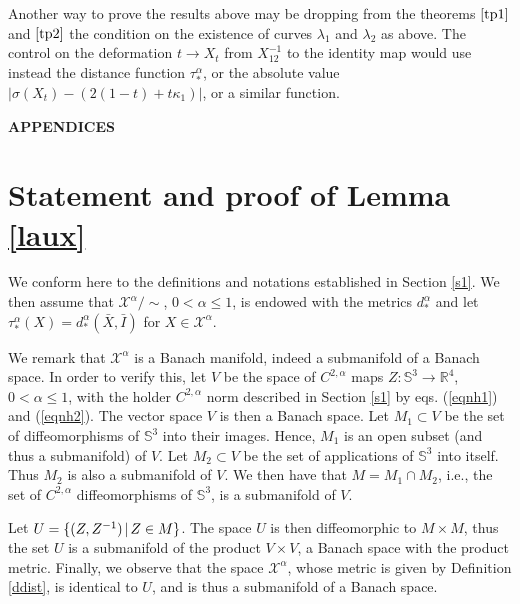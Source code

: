 \documentclass{article}
\def\S3{{\mathbb S^3}}
\begin{document}
Another way to prove the results above may be dropping from the theorems $\ref{tp1}$ and $\ref{tp2}$ the condition on the existence of curves $\lambda_1$ and $\lambda_2$ as above. The control on the deformation $t\to X_t$ from $X_{12}^{-1}$ to the identity map would use instead the distance function $\tau^\alpha_*$, or the absolute value 
$|\sigma(X_t)-(2(1-t)+t\kappa_1)|$, or a similar function.


\vspace{.35in}

\centerline{\large \bf APPENDICES} 

\appendix

\vspace{.1in}

\section{Statement and proof of Lemma \ref{laux}}\label{A1}

\vspace{.2in}




We conform here to the definitions and notations established in Section \ref{s1}.
We then assume that $\mathcal X^\alpha/\sim$, $0<\alpha\leq 1$, is endowed with the metrics $d_*^\alpha$ and let  $\tau_*^\alpha(X)=d_*^\alpha(\bar X,\bar I)$ for $X\in \mathcal X^\alpha$. 
 

We remark that $\mathcal X^\alpha$ is a Banach manifold, indeed a submanifold of a Banach space. 
In order to verify this, let $V$ be the space of $C^{2,\alpha}$ maps $Z:\S3\to\mathbb R^4$, $0<\alpha\leq 1$, with the holder $C^{2,\alpha}$ norm described in Section \ref{s1} by eqs. (\ref{eqnh1}) and (\ref{eqnh2}). The vector space $V$ is then a Banach space. Let $M_1\subset V$ be the set of diffeomorphisms of $\S3$ into their images. Hence, $M_1$ is an open subset (and thus a submanifold) of $V$. Let $M_2\subset V$ be the set of applications of $\S3$ into itself. Thus $M_2$ is also  a submanifold of $V$. We then have that $M=M_1\cap M_2$, i.e., the set of $C^{2,\alpha}$ diffeomorphisms of $\S3$, is a submanifold of $V$.
 
 
Let $U=\{(Z,Z^{-1})\hspace{.02in}|\hspace{.02in}Z\in M\}$. The space $U$ is then diffeomorphic to $M\times M$, thus the set $U$ is a submanifold of the product $V\times V$, a Banach space with the product metric.  Finally, we observe that
the space $\mathcal X^\alpha$, whose metric is given by Definition \ref{ddist}, is identical to $U$, and is thus a submanifold of a Banach space.  
\end{document}
